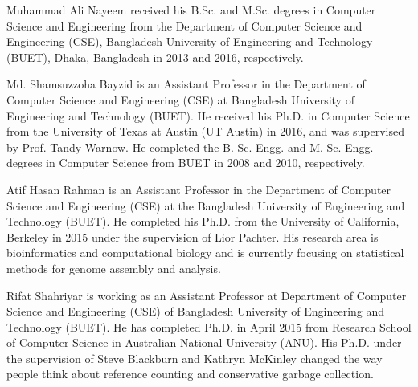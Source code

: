 \documentclass[journal]{IEEEtran}
\begin{document}



 





 


\begin{IEEEbiographynophoto}{Muhammad Ali Nayeem} received his B.Sc. and M.Sc. degrees in Computer Science and Engineering from the Department of Computer Science and Engineering (CSE), Bangladesh University of Engineering and Technology (BUET), Dhaka, Bangladesh in 2013 and 2016, respectively. 
	
\end{IEEEbiographynophoto}

\begin{IEEEbiographynophoto}{Md. Shamsuzzoha Bayzid} is an Assistant Professor in the Department of Computer Science and Engineering (CSE) at Bangladesh University of Engineering and Technology (BUET).  He received his Ph.D. in Computer Science from the University of Texas at Austin (UT Austin) in 2016, and was supervised by Prof. Tandy Warnow. He completed the B. Sc. Engg. and M. Sc. Engg. degrees in Computer Science from BUET in 2008 and 2010, respectively. %
\end{IEEEbiographynophoto}

\begin{IEEEbiographynophoto}{Atif Hasan Rahman} is an Assistant Professor in the Department of Computer Science and Engineering (CSE) at the Bangladesh University of Engineering and Technology (BUET). He completed his Ph.D. from the University of California, Berkeley in 2015 under the supervision of Lior Pachter. His research area is bioinformatics and computational biology and is currently focusing on statistical methods for genome assembly and analysis.%
\end{IEEEbiographynophoto}

\begin{IEEEbiographynophoto}{Rifat Shahriyar} is working as an Assistant Professor at Department of Computer Science and Engineering (CSE) of Bangladesh University of Engineering and Technology (BUET). He has completed Ph.D. in April 2015 from Research School of Computer Science in Australian National University (ANU). His Ph.D. under the supervision of Steve Blackburn and Kathryn McKinley changed the way people think about reference counting and conservative garbage collection. %
\end{IEEEbiographynophoto}
\end{document}
